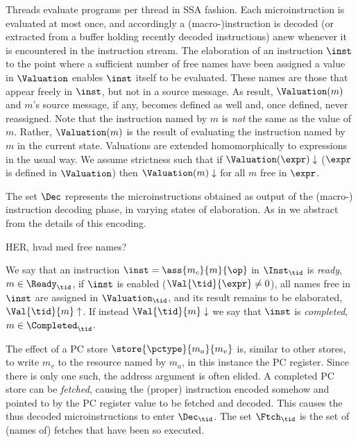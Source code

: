 Threads evaluate programs per thread in SSA fashion. Each microinstruction is evaluated at most once, and accordingly a (macro-)instruction is decoded (or extracted from a buffer holding recently decoded instructions) anew whenever it is encountered in the instruction stream.
The elaboration of an instruction $\inst$ to the point where a sufficient number of free names
have been assigned a value in $\Valuation$ enables $\inst$ itself to be evaluated. These names are those that appear freely in $\inst$, but not in a source message. As result, $\Valuation(m)$ and $m$'s source message, if any, becomes defined as well and, once defined, never reassigned.
Note that the instruction named by $m$ is \emph{not} the same as the value of $m$.
Rather, $\Valuation(m)$ is the result of evaluating the instruction named by $m$ in the current state.
Valuations are extended homomorphically to expressions in the usual way. We assume strictness such that if $\Valuation(\expr)\downarrow$ ($\expr$ is defined in $\Valuation$) then $\Valuation(m)\downarrow$ for all $m$ free in $\expr$. 

The set $\Dec$ represents the  microinstructions obtained as output of the (macro-) instruction decoding phase, in varying states of elaboration. As in \cite{MIL} we abstract from the details of this encoding.

HER, hvad med free names?

We say that an instruction $\inst=\ass{m_c}{m}{\op}$ in $\Inst_\tid$ is \emph{ready}, $m\in\Ready_\tid$, if $\inst$ is enabled ($\Val{\tid}{\expr}\neq 0$), all names free in $\inst$ are assigned in $\Valuation_\tid$, and its result remains to be elaborated, $\Val{\tid}{m}\uparrow$. If instead $\Val{\tid}{m}\downarrow$ we say that $\inst$ is \emph{completed}, $m\in\Completed_\tid$.

The effect of a PC store $\store{\pctype}{m_a}{m_v}$ is, similar to other stores, to write $m_v$ to the resource named by $m_a$, in this instance the PC register. Since there is only one such, the address argument is often elided. A completed PC store can be \emph{fetched}, causing the (proper) instruction encoded somehow and pointed to by the PC register value to be fetched and decoded. This causes the thus decoded microinstructions to enter $\Dec_\tid$. The set $\Ftch_\tid$ is the set of (names of) fetches that have been so executed.



